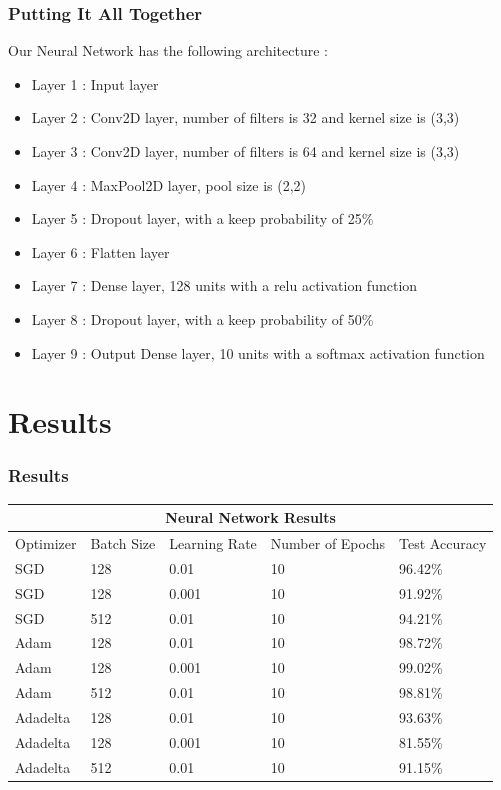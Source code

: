 \documentclass{beamer}
\begin{document}
\begin{frame}
\frametitle{Putting It All Together}
\begin{block}{Our Neural Network has the following architecture :}
\begin{itemize}
\item Layer 1 : Input layer
\item Layer 2 : Conv2D layer, number of filters is 32 and kernel size is (3,3)
\item Layer 3 : Conv2D layer, number of filters is 64 and kernel size is (3,3)
\item Layer 4 : MaxPool2D layer, pool size is (2,2)
\item Layer 5 : Dropout layer, with a keep probability of 25\%
\item Layer 6 : Flatten layer
\item Layer 7 : Dense layer, 128 units with a relu activation function
\item Layer 8 : Dropout layer, with a keep probability of 50\%
\item Layer 9 : Output Dense layer, 10 units with a softmax activation function
\end{itemize}
\end{block}
\end{frame}

\section{Results}

\begin{frame}
\frametitle{Results}
\begin{center}
\begin{tabular}{|p{2cm}||p{2cm}|p{2cm}|p{2cm}|p{2cm}|}
\hline
\multicolumn{5}{|c|}{Neural Network Results} \\
\hline
Optimizer & Batch Size & Learning Rate & Number of Epochs & Test Accuracy\\
\hline
SGD & 128 & 0.01 & 10 & 96.42\%\\
\hline
SGD & 128 & 0.001 & 10 & 91.92\%\\
\hline
SGD & 512 & 0.01 & 10 & 94.21\%\\
\hline
Adam & 128 & 0.01 & 10 & 98.72\%\\
\hline
Adam & 128 & 0.001 & 10 & 99.02\%\\
\hline
Adam & 512 & 0.01 & 10 & 98.81\%\\
\hline
Adadelta & 128 & 0.01 &10 & 93.63\%\\
\hline
Adadelta & 128 & 0.001 &10 & 81.55\%\\
\hline
Adadelta & 512 & 0.01 &10 & 91.15\%\\
\hline
\end{tabular}
\end{center}
\end{frame}
\end{document}
